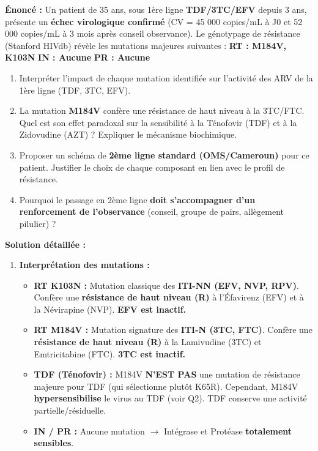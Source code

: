 \documentclass[11pt]{article}
\begin{document}
\begin{exoresolu}
\textbf{Énoncé :} Un patient de 35 ans, sous 1ère ligne \textbf{TDF/3TC/EFV} depuis 3 ans, présente un \textbf{échec virologique confirmé} (CV = 45 000 copies/mL à J0 et 52 000 copies/mL à 3 mois après conseil observance). Le génotypage de résistance (Stanford HIVdb) révèle les mutations majeures suivantes :
\textbf{RT : M184V, K103N} \quad \textbf{IN : Aucune} \quad \textbf{PR : Aucune}
\begin{enumerate}
    \item Interpréter l'impact de chaque mutation identifiée sur l'activité des ARV de la 1ère ligne (TDF, 3TC, EFV).
    \item La mutation \textbf{M184V} confère une résistance de haut niveau à la 3TC/FTC. Quel est son effet paradoxal sur la sensibilité à la Ténofovir (TDF) et à la Zidovudine (AZT) ? Expliquer le mécanisme biochimique.
    \item Proposer un schéma de \textbf{2ème ligne standard (OMS/Cameroun)} pour ce patient. Justifier le choix de chaque composant en lien avec le profil de résistance.
    \item Pourquoi le passage en 2ème ligne \textbf{doit s'accompagner d'un renforcement de l'observance} (conseil, groupe de pairs, allègement pilulier) ?
\end{enumerate}
\tcblower
\textbf{Solution détaillée :}
\begin{enumerate}
    \item \textbf{Interprétation des mutations :}
    \begin{itemize}
        \item \textbf{RT K103N :} Mutation classique des \textbf{ITI-NN (EFV, NVP, RPV)}. Confère une \textbf{résistance de haut niveau (R)} à l'Éfavirenz (EFV) et à la Névirapine (NVP). \textbf{EFV est inactif.}
        \item \textbf{RT M184V :} Mutation signature des \textbf{ITI-N (3TC, FTC)}. Confère une \textbf{résistance de haut niveau (R)} à la Lamivudine (3TC) et Emtricitabine (FTC). \textbf{3TC est inactif.}
        \item \textbf{TDF (Ténofovir) :} M184V \textbf{N'EST PAS} une mutation de résistance majeure pour TDF (qui sélectionne plutôt K65R). Cependant, M184V \textbf{hypersensibilise} le virus au TDF (voir Q2). TDF conserve une activité partielle/résiduelle.
        \item \textbf{IN / PR :} Aucune mutation $\rightarrow$ Intégrase et Protéase \textbf{totalement sensibles}.

\end{itemize}
\end{enumerate}
\end{exoresolu}
\end{document}
